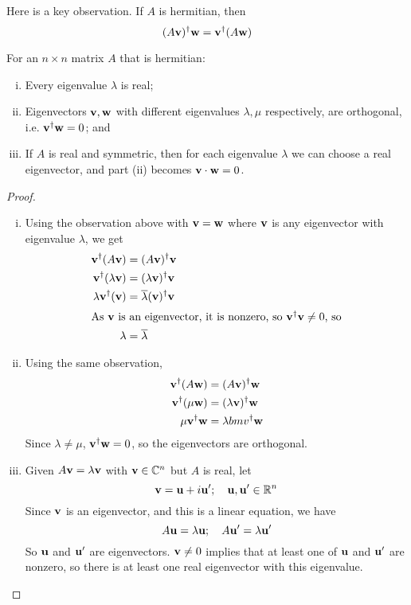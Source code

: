 \documentclass{article}
\begin{document}
Here is a key observation. If $A$ is hermitian, then
\[ (A\vb v)^\dagger \vb w = \vb v^\dagger (A \vb w) \]
\begin{theorem}
    For an $n \times n$ matrix $A$ that is hermitian:
    \begin{enumerate}[(i)]
        \item Every eigenvalue $\lambda$ is real;
        \item Eigenvectors $\vb v, \vb w$ with different eigenvalues $\lambda, \mu$ respectively, are orthogonal, i.e. $\vb v^\dagger \vb w = 0$; and
        \item If $A$ is real and symmetric, then for each eigenvalue $\lambda$ we can choose a real eigenvector, and part (ii) becomes $\vb v \cdot \vb w = 0$.
    \end{enumerate}
\end{theorem}
\begin{proof}
    \begin{enumerate}[(i)]
        \item Using the observation above with $\vb v = \vb w$ where $\vb v$ is any eigenvector with eigenvalue $\lambda$, we get
              \begin{align*}
                  \vb v^\dagger (A\vb v)        & = (A\vb v)^\dagger \vb v                   \\
                  \vb v^\dagger (\lambda\vb v)  & = (\lambda\vb v)^\dagger \vb v             \\
                  \lambda \vb v^\dagger (\vb v) & = \overline{\lambda} (\vb v)^\dagger \vb v \\
                  \intertext{As $\vb v$ is an eigenvector, it is nonzero, so $\vb v^\dagger \vb v \neq 0$, so}
                  \lambda                       & = \overline \lambda
              \end{align*}
        \item Using the same observation,
              \begin{align*}
                  \vb v^\dagger (A \vb w)   & = (A \vb v)^\dagger \vb w       \\
                  \vb v^\dagger (\mu \vb w) & = (\lambda \vb v)^\dagger \vb w \\
                  \mu \vb v^\dagger \vb w   & = \lambda bm v^\dagger \vb w
              \end{align*}
              Since $\lambda \neq \mu$, $\vb v^\dagger \vb w = 0$, so the eigenvectors are orthogonal.
        \item Given $A\vb v = \lambda \vb v$ with $\vb v \in \mathbb C^n$ but $A$ is real, let
              \[ \vb v = \vb u + i\vb u';\quad \vb u, \vb u' \in \mathbb R^n \]
              Since $\vb v$ is an eigenvector, and this is a linear equation, we have
              \[ A\vb u = \lambda \vb u;\quad A\vb u' = \lambda \vb u' \]
              So $\vb u$ and $\vb u'$ are eigenvectors. $\vb v \neq 0$ implies that at least one of $\vb u$ and $\vb u'$ are nonzero, so there is at least one real eigenvector with this eigenvalue.
    \end{enumerate}
\end{proof}
\end{document}
